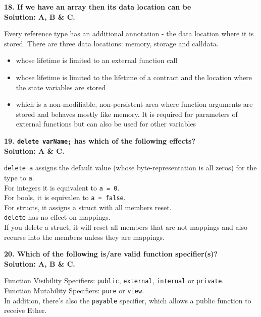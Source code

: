 \textbf{18. If we have an array then its data location can be}\label{sec:exam2_q18}\\

\textbf{Solution: A, B \& C.}

Every reference type has an additional annotation - the data location where it is stored.
There are three data locations: memory, storage and calldata.

\begin{itemize}
    \item whose lifetime is limited to an external function call
    \item whose lifetime is limited to the lifetime of a contract and the location where the state variables are stored
    \item which is a non-modifiable, non-persistent area where function arguments are stored and behaves mostly like memory.
        It is required for parameters of external functions but can also be used for other variables
\end{itemize}

\textbf{19. \texttt{delete varName;} has which of the following effects?}\label{sec:exam2_q19}\\

\textbf{Solution: A \& C.}

\verb|delete a| assigns the default value (whose byte-representation is all zeros) for the type to \verb|a|.\\

For integers it is equivalent to \verb|a = 0|.\\
For bools, it is equivalen to \verb|a = false|.\\
For structs, it assigns a struct with all members reset.\\
\verb|delete| has no effect on mappings.\\
If you delete a struct, it will reset all members that are not mappings and also recurse into the members unless they are mappings.\\

\pagebreak

\textbf{20. Which of the following is/are valid function specifier(s)?}\label{sec:exam2_q20}\\

\textbf{Solution: A, B \& C.}

Function Visibility Specifiers: \verb|public|, \verb|external|, \verb|internal| or \verb|private|.\\
Function Mutability Specifiers: \verb|pure| or \verb|view|.\\
In addition, there's also the \verb|payable| specifier, which allows a public function to receive Ether.\\

